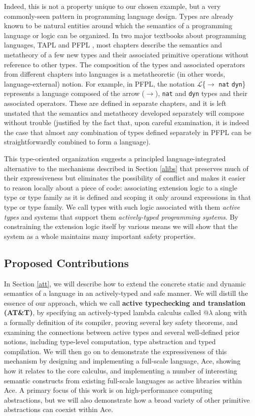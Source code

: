 Indeed, this is not a property unique to our chosen example, but a very commonly-seen pattern in programming language design. Types are already known to be natural entities around which the semantics of a programming language or logic can be organized. In two major textbooks about programming languages, TAPL \cite{tapl} and PFPL \cite{pfpl}, most chapters describe the semantics and metatheory of a few new types and their associated primitive operations without reference to other types. The composition of the types and associated operators from different chapters into languages is a metatheoretic (in other words, language-external) notion. For example, in PFPL, the notation $\mathcal{L}$\{$\rightarrow$ \verb|nat| \verb|dyn|\} represents a language composed of the arrow ($\rightarrow$), \verb|nat| and \verb|dyn| types and their associated operators. These are defined in separate chapters, and it is  left unstated that the semantics and metatheory developed separately will compose without trouble (justified by the fact that, upon careful examination, it is indeed the case that almost any combination of types defined separately in PFPL can be straightforwardly combined to form a language). 

This type-oriented organization suggests a principled language-integrated alternative to the mechanisms described in Section \ref{alibs} that preserves much of their expressiveness but eliminates the possibility of conflict and makes it easier to reason locally about a piece of code: associating extension logic to a single type or type family as it is defined and scoping it only around expressions in that type or type family.  We call types with such logic associated with them \emph{active types} and systems that support them \emph{actively-typed programming systems}. By constraining the extension logic itself by various means we will show that the system as a whole maintains many important safety properties.

\subsection{Proposed Contributions}
In Section \ref{att}, we will describe how to extend the concrete static and dynamic semantics of a language in an actively-typed and safe manner. We will distill the essence of our approach, which we call \textbf{active typechecking and translation (AT\&T)}, by specifying an actively-typed lambda calculus called @$\lambda$ along with a formally definition of its compiler, proving several key safety theorems, and examining the connections between active types and several well-defined prior notions, including type-level computation, type abstraction and typed compilation. We will then go on to demonstrate the expressiveness of this mechanism by designing and implementing a full-scale language, Ace, showing how it relates to the core calculus, and implementing a number of interesting semantic constructs from existing full-scale languages as active libraries within Ace. A primary focus of this work is on high-performance computing abstractions, but we will also demonstrate how a broad variety of other primitive abstractions can coexist within Ace.

